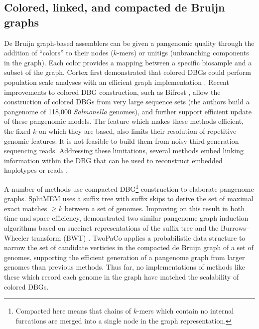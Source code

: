 


\subsection{Colored, linked, and compacted de Bruijn graphs}

De Bruijn graph-based assemblers can be given a pangenomic quality through the addition of ``colors'' to their nodes ($k$-mers) or unitigs (unbranching components in the graph).
Each color provides a mapping between a specific biosample and a subset of the graph.
Cortex first demonstrated that colored DBGs could perform population scale analyses with an efficient graph implementation \cite{Iqbal_2012}.
Recent improvements to colored DBG construction, such as Bifrost \cite{holley2019bifrost}, allow the construction of colored DBGs from very large sequence sets (the authors build a pangenome of 118,000 \emph{Salmonella} genomes), and further support efficient update of these pangenomic models.
The feature which makes these methods efficient, the fixed $k$ on which they are based, also limits their resolution of repetitive genomic features.
It is not feasible to build them from noisy third-generation sequencing reads.
Addressing these limitations, several methods embed linking information within the DBG that can be used to reconstruct embedded haplotypes or reads \cite{Bolger_2017,Turner_2018}.

A number of methods use compacted DBG\footnote{Compacted here means that chains of $k$-mers which contain no internal furcations are merged into a single node in the graph representation.} construction to elaborate pangenome graphs.
SplitMEM \cite{Marcus_2014} uses a suffix tree with suffix skips to derive the set of maximal exact matches $\geq k$ between a set of genomes.
Improving on this result in both time and space efficiency, \cite{Baier_2015} demonstrated two similar pangenome graph induction algorithms based on succinct representations of the suffix tree and the Burrows--Wheeler transform (BWT) \cite{Burrows_1994}.
TwoPaCo \cite{Minkin_2016} applies a probabilistic data structure to narrow the set of candidate verticies in the compacted de Bruijn graph of a set of genomes, supporting the efficient generation of a pangenome graph from larger genomes than previous methods.
Thus far, no implementations of methods like these which record each genome in the graph have matched the scalability of colored DBGs.

